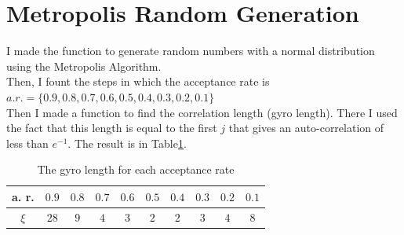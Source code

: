 \documentclass[12pt]{article}
\begin{document}
	\section{Metropolis Random Generation}
	 I made the function to generate random numbers with a normal distribution using the Metropolis Algorithm.\\
	 Then, I fount the steps in which the acceptance rate is $a.r. = \{0.9, 0.8, 0.7, 0.6, 0.5, 0.4, 0.3, 0.2, 0.1\}$\\
	 Then I made a function to find the correlation length (gyro length). There I used the fact that this length is equal to the first $j$ that gives an
	 auto-correlation of less than $e^{-1}$.
	 The result is in Table\ref{tab:rand}.
	 \begin{table}[h]
		\centering
		\begin{tabular}{|c|c|c|c|c|c|c|c|c|c|}
			\hline
			a. r. & $0.9$ & $0.8$ & $0.7$ & $0.6$ & $0.5$ & $0.4$ & $0.3$ & $0.2$ & $0.1$ \\
			\hline
			$\xi$ & $28$ & $9$ & $4$ & $3$ & $2$ & $2$ & $3$ & $4$ & $8$ \\
			\hline
		\end{tabular}
	\caption{The gyro length for each acceptance rate}
	\label{tab:rand}
	 \end{table}
	
	
\end{document}
